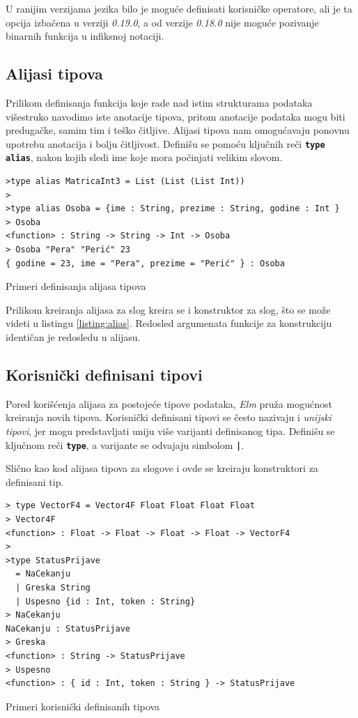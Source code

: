 \documentclass[12pt,oneside]{memoir}
\begin{document}
U ranijim verzijama jezika bilo je moguće definisati korisničke operatore, ali je ta
opcija izbačena u verziji \emph{0.19.0}, a od verzije \emph{0.18.0} nije moguće pozivanje 
binarnih funkcija u infiksnoj notaciji.

\subsection{Alijasi tipova}
Prilikom definisanja funkcija koje rade nad istim strukturama podataka višestruko navodimo
iste anotacije tipova, pritom anotacije podataka mogu biti predugačke, samim tim i
teško čitljive. Alijasi tipova nam omogućavaju ponovnu upotrebu anotacija i bolju čitljivost.
Definišu se pomoću ključnih reči \texttt{\textbf{type alias}}, nakon kojih sledi ime koje
mora počinjati velikim slovom. 
\begin{listing}[h]
\begin{verbatim}
>type alias MatricaInt3 = List (List (List Int))
>
>type alias Osoba = {ime : String, prezime : String, godine : Int }
> Osoba
<function> : String -> String -> Int -> Osoba
> Osoba "Pera" "Perić" 23
{ godine = 23, ime = "Pera", prezime = "Perić" } : Osoba
\end{verbatim}
\caption{Primeri definisanja alijasa tipova}
\label{listing:alias}
\end{listing}

Prilikom kreiranja alijasa za slog kreira se i konstruktor za slog, što se može videti
u listingu \ref{listing:alias}. Redosled argumenata funkcije za konstrukciju identičan je
redosledu u alijasu.
\subsection{Korisnički definisani tipovi}
Pored korišćenja alijasa za postojeće tipove podataka, \emph{Elm} pruža mogućnost kreiranja novih 
tipova. Korisnički definisani tipovi se često nazivaju i \emph{unijski tipovi}, jer mogu  
predstavljati uniju više varijanti definisanog tipa. Definišu se ključnom reči 
\textbf{\texttt{type}}, a varijante se odvajaju simbolom \texttt{\textbf{|}}.

Slično kao kod alijasa tipova za slogove i ovde se kreiraju konstruktori za definisani tip. 
\begin{listing}[h]
\begin{verbatim}
> type VectorF4 = Vector4F Float Float Float Float
> Vector4F
<function> : Float -> Float -> Float -> Float -> VectorF4
>
>type StatusPrijave 
  = NaCekanju 
  | Greska String 
  | Uspesno {id : Int, token : String}
> NaCekanju
NaCekanju : StatusPrijave
> Greska
<function> : String -> StatusPrijave
> Uspesno
<function> : { id : Int, token : String } -> StatusPrijave
\end{verbatim}
\caption{ Primeri korisnički definisanih tipova}
\end{listing}
\end{document}
